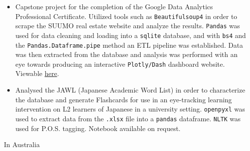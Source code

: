 \documentclass[10pt,a4paper,ragged2e,withhyper]{altacv}
\begin{document}
\begin{paracol}{2}
\label{sec:orgd006724}
\begin{itemize}
\item Capstone project for the completion of the Google Data Analytics Professional Certificate. Utilized tools such as \texttt{Beautifulsoup4} in order to scrape the SUUMO real estate website and analyze the results. \texttt{Pandas} was used for data cleaning and loading into a \texttt{sqlite} database, and with \texttt{bs4} and the \texttt{Pandas.Dataframe.pipe} method an ETL pipeline was established. Data was then extracted from the database and analysis was performed with an eye towards producing an interactive \texttt{Plotly/Dash} dashboard website. Viewable \href{https://github.com/nanjigen/tokyo-rentals-analysis}{here}.
\end{itemize}
\begin{itemize}
\item Analysed the JAWL (Japanese Academic Word List) in order to characterize the database and generate Flashcards for use in an eye-tracking learning intervention on L2 learners of Japanese in a university setting. \texttt{openpyxl} was used to extract data from the \texttt{.xlsx} file into a \texttt{pandas} dataframe. \texttt{NLTK} was used for P.O.S. tagging. Notebook available on request.
\end{itemize}

\label{sec:org80528e7}
In Australia
\switchcolumn

\label{sec:orga49024e}





\end{paracol}
\end{document}

